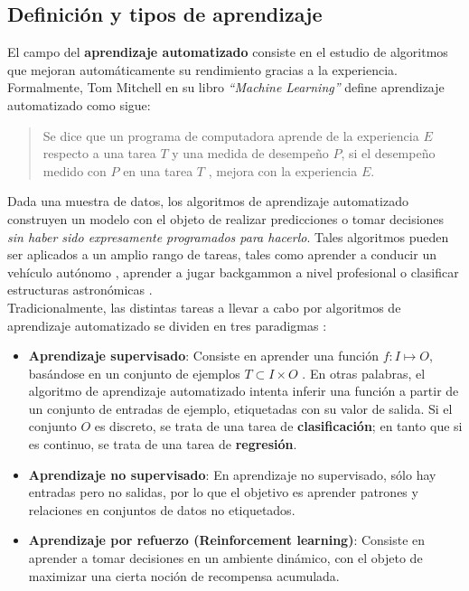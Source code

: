 \subsection{Definición y tipos de aprendizaje}

El campo del \textbf{aprendizaje automatizado} consiste en el estudio de algoritmos que mejoran automáticamente su rendimiento gracias a la experiencia. Formalmente, Tom Mitchell en su libro \textit{ ``Machine Learning''} \cite{mitchell} define aprendizaje automatizado como sigue:

\begin{quotation}
Se dice que un programa de computadora aprende de la experiencia $E$ respecto a una tarea $T$ y una medida de desempeño $P$, si el desempeño medido con $P$ en una tarea $T$ , mejora con la experiencia $E$.
\end{quotation}

Dada una muestra de datos, los algoritmos de aprendizaje automatizado construyen un modelo con el objeto de realizar predicciones o tomar decisiones \textit{sin haber sido expresamente programados para hacerlo}. Tales algoritmos pueden ser aplicados a un amplio rango de tareas, tales como aprender a conducir un vehículo autónomo \cite{Pomerleau-1989-15721}, aprender a jugar backgammon a nivel profesional \cite{Tesauro1995} o clasificar estructuras astronómicas \cite{clasify_astronomy}.  \\

Tradicionalmente, las distintas tareas a llevar a cabo por algoritmos de aprendizaje automatizado se dividen en tres paradigmas \cite{ai}:

\begin{itemize}
\item \textbf{Aprendizaje supervisado}: Consiste en aprender una función $f : I \mapsto O$, basándose en un conjunto de ejemplos $T \subset I \times O$ . En otras palabras, el algoritmo de aprendizaje automatizado intenta inferir una función a partir de un conjunto de entradas de ejemplo, etiquetadas con su valor de salida. Si el conjunto $O$ es discreto, se trata de una tarea de \textbf{clasificación}; en tanto que si es continuo, se trata de una tarea de \textbf{regresión}.
\item \textbf{Aprendizaje no supervisado}: En aprendizaje no supervisado, sólo hay entradas pero no salidas, por lo que el objetivo es aprender patrones y relaciones en conjuntos de datos no etiquetados.

\item \textbf{Aprendizaje por refuerzo (Reinforcement learning)}: Consiste en aprender a tomar decisiones en un ambiente dinámico, con el objeto de maximizar una cierta noción de recompensa acumulada. 
\end{itemize}

